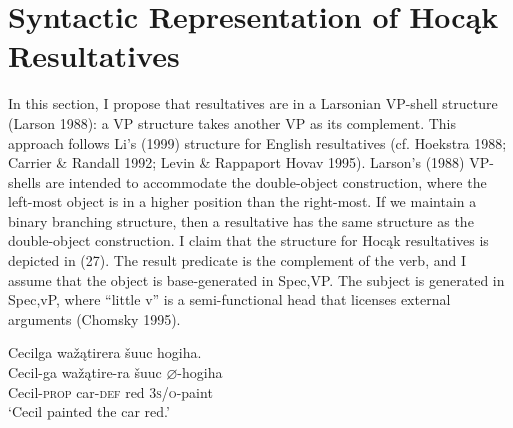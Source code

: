 \documentclass[output=paper]{LSP/langsci}
\begin{document}
\section{Syntactic Representation of Hocąk Resultatives}
 
In this section, I propose that resultatives are in a Larsonian VP-shell structure (Larson 1988): a VP structure takes another VP as its complement. This approach follows Li's (1999) structure for English resultatives (cf. Hoekstra 1988; Carrier \& Randall 1992; Levin \& Rappaport Hovav 1995). Larson's (1988) VP-shells are intended to accommodate the double-object construction, where the left-most object is in a higher position than the right-most. If we maintain a binary branching structure, then a resultative has the same structure as the double-object construction. I claim that the structure for Hocąk resultatives is depicted in (27). The result predicate is the complement of the verb, and I assume that the object is base-generated in Spec,VP. The subject is generated in Spec,vP, where ``little v'' is a semi-functional head that licenses external arguments (Chomsky 1995).

\begin{exe}
\ex
\begin{xlist}

\ex \glll Cecilga wažątirera šuuc hogiha. \\
Cecil-ga  wažątire-ra šuuc {$\varnothing$}-hogiha \\
Cecil-\textsc{prop} car-\textsc{def} red \textsc{3s/o}-paint\\
\glt `Cecil painted the car red.'

\ex 
{\hspace{1em}}\newline
{}
\end{xlist}
\end{exe}
\end{document}

